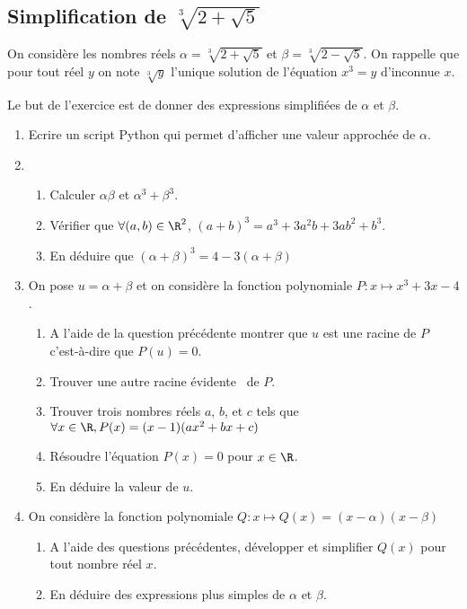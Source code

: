 \subsection{Simplification  de $\sqrt[3]{2+\sqrt{5}}$ }
\begin{exercice}
On considère les nombres réels $\alpha =\sqrt[3]{2+\sqrt{5}}$ et $\beta =\sqrt[3]{2-\sqrt{5}}$. On rappelle que pour tout réel $y$ on note $\sqrt[3]{y}$ l'unique solution de l'équation $x^3=y$ d'inconnue $x$.

Le but de l'exercice est de donner des expressions simplifiées de $\alpha$ et $\beta$. 

\begin{enumerate}
\item Ecrire un script Python qui permet d'afficher une valeur approchée de $\alpha$.
\item 
\begin{enumerate}
\item Calculer $\alpha \beta$ et $\alpha^3+\beta^3$.
\item Vérifier que $\forall (a,b)\in \R^2$, $(a+b) ^3 = a^3 +3a^2b+3ab^2 +b^3$.
\item En déduire que  $(\alpha+\beta)^3= 4-3(\alpha+\beta)$ 
\end{enumerate}
\item On pose $u=\alpha +\beta$ et on considère la fonction polynomiale $P : x\mapsto x^3+3x-4$. 
\begin{enumerate}
\item A l'aide de  la question précédente montrer que $u$ est une racine de $P$ c'est-à-dire que $P(u)=0$. 
\item Trouver une autre racine \og évidente \fg\, de $P$.
\item Trouver trois nombres réels $a$, $b$, et $c$ tels que $\forall x\in \R, P(x) = (x-1)(ax^2+bx+c)$
\item Résoudre l'équation $P(x)=0$ pour $x\in \R$.
\item En déduire la valeur de $u$. 
\end{enumerate}
\item On considère la fonction polynomiale $Q : x\mapsto Q(x) = (x-\alpha)(x-\beta)$
\begin{enumerate}
\item A l'aide des questions précédentes, développer et simplifier $Q(x)$ pour tout nombre réel $x$. 
\item En déduire des expressions plus simples de $\alpha $ et $\beta$. 
\end{enumerate}
\end{enumerate}
\end{exercice}

